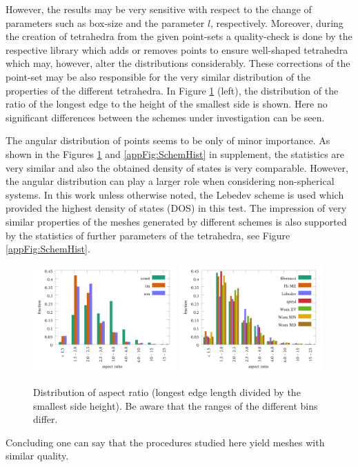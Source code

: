 However, the results may be very sensitive with respect to the change of parameters such as box-size and the parameter $l$, respectively.
Moreover, during the creation of tetrahedra from the given point-sets a quality-check is done by the respective library \cite{tetgen} which adds or removes points to ensure well-shaped tetrahedra which may, however, alter the distributions considerably.
These corrections of the point-set may be also responsible for the very similar distribution of the properties of the different tetrahedra.
In Figure \ref{fig:SchemHist} (left), the distribution of the ratio of the longest edge to the height of the smallest side is shown.
Here no significant differences between the schemes under investigation can be seen.

The angular distribution of points seems to be only of minor importance.
As shown in the Figures \ref{fig:SchemHist} and \ref{appFig:SchemHist} in supplement, the statistics are very similar and also the obtained density of states is very comparable.
However, the angular distribution can play a larger role when considering non-spherical systems.
In this work unless otherwise noted, the Lebedev scheme is used which provided the highest density of states (DOS) in this test.
The impression of very similar properties of the meshes generated by different schemes is also supported by the statistics of further parameters of the tetrahedra, see Figure \ref{appFig:SchemHist}.
\begin{figure}
\includegraphics[width=0.49\textwidth]{Figures/Radi_hist.pdf}
\includegraphics[width=0.49\textwidth]{Figures/Sph_hist.pdf}
\caption{Distribution of aspect ratio (longest edge length divided by the smallest side height).
   Be aware that the ranges of the different bins differ.}
\label{fig:SchemHist}
\end{figure}
Concluding one can say that the procedures studied here yield meshes with similar quality.

